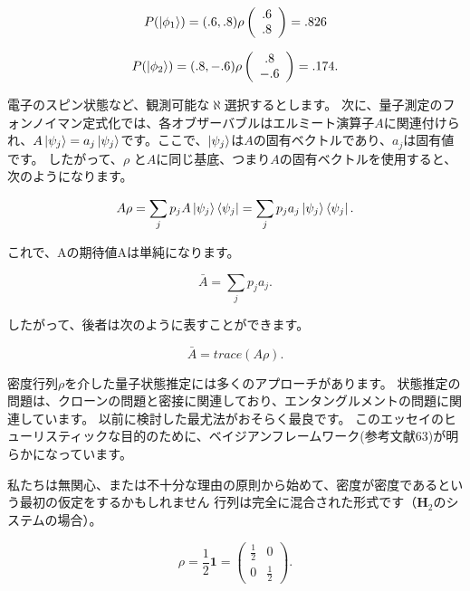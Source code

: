 \begin{equation}
\label{244}
P(\ket{\phi_1})
=
(.6, .8) \rho
\left( \begin{array}{c}
.6  \\
.8
\end{array} \right)
=.826
\end{equation}

\begin{equation}
\label{245}
P(\ket{\phi_2})
=
(.8, -.6) \rho
\left( \begin{array}{c}
.8  \\
-.6
\end{array} \right)
=.174.
\end{equation}


電子のスピン状態など、観測可能な$\aleph$選択するとします。
次に、量子測定のフォンノイマン定式化では、各オブザーバブルはエルミート演算子$A$に関連付けられ、$A \ket{\psi_j} = a_j \ket{\psi_j} $です。ここで、$\ket{\psi_j}$は$A$の固有ベクトルであり、$a_j$は固有値です。
したがって、$\rho$ と$A$に同じ基底、つまり$A$の固有ベクトルを使用すると、次のようになります。

\begin{equation}
\label{246}
A \rho = \sum_j p_j A \ket{\psi_j} \bra{\psi_j}
=
\sum_j p_j a_j \ket{\psi_j} \bra{\psi_j}.
\end{equation}

これで、Aの期待値Aは単純になります。

\begin{equation}
\label{247}
\bar{A}  = \sum_j p_j a_j.
\end{equation}

したがって、後者は次のように表すことができます。

\begin{equation}
\label{248}
\bar{A}  = trace(A \rho).
\end{equation}

密度行列$\rho$を介した量子状態推定には多くのアプローチがあります。
状態推定の問題は、クローンの問題と密接に関連しており、エンタングルメントの問題に関連しています。
以前に検討した最尤法がおそらく最良です。 このエッセイのヒューリスティックな目的のために、ベイジアンフレームワーク(参考文献63)が明らかになっています。

私たちは無関心、または不十分な理由の原則から始めて、密度が密度であるという最初の仮定をするかもしれません
行列は完全に混合された形式です（$\mathbf{H}_2$のシステムの場合）。

\begin{equation}
\label{249}
\rho  = \frac{1}{2} \mathbf{1} =
\left( \begin{array}{cc}
\frac{1}{2} & 0 \\
0 & \frac{1}{2}
\end{array} \right).
\end{equation}

